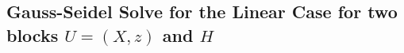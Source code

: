 \begin{itemize}


 

\section{Gauss-Seidel Solve for the Linear Case for two blocks $U = (X,z)$ and $H$} 


\end{itemize}

